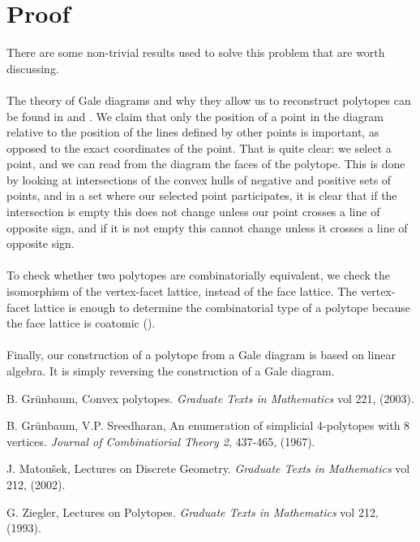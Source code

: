 \documentclass[paper=a4, fontsize=11pt]{scrartcl} %
\theoremstyle{definition}
\begin{document}
\section{Proof}
There are some non-trivial results used to solve this problem that are worth discussing.\\
\\
The theory of Gale diagrams and why they allow us to reconstruct polytopes can be found in \cite{Ma02} and \cite{Zi93}. We claim that  only the position of a point in the diagram relative to the position of the lines defined by other points is important, as opposed to the exact coordinates of the point. That is quite clear: we select a point, and we can read from the diagram the faces of the polytope. This is done by looking at intersections of the convex hulls of negative and positive sets of points, and in a set where our selected point participates, it is clear that if the intersection is empty this does not change unless our point crosses a line of opposite sign, and if it is not empty this cannot change unless it crosses a line of opposite sign. \\
\\
To check whether two polytopes are combinatorially equivalent, we check the isomorphism of the vertex-facet lattice, instead of the face lattice. The vertex-facet lattice is enough to determine the combinatorial type of a polytope because the face lattice is coatomic (\cite{Ma02}).\\
\\
Finally, our construction of a polytope from a Gale diagram is based on linear algebra. It is simply reversing the construction of a Gale diagram.
\begin{thebibliography}{9}

B. Gr{\"u}nbaum, Convex polytopes. \textit{Graduate
Texts in Mathematics} vol 221, (2003).

B. Gr{\"u}nbaum, V.P. Sreedharan, An enumeration of simplicial 4-polytopes with 8 vertices. \textit{Journal of Combinatiorial Theory 2}, 437-465, (1967).

J. Matou{\v s}ek, Lectures on Discrete Geometry. \textit{Graduate
Texts in Mathematics} vol 212, (2002).

G. Ziegler, Lectures on Polytopes. \textit{Graduate
Texts in Mathematics} vol 212, (1993).

\end{thebibliography}
\end{document}
